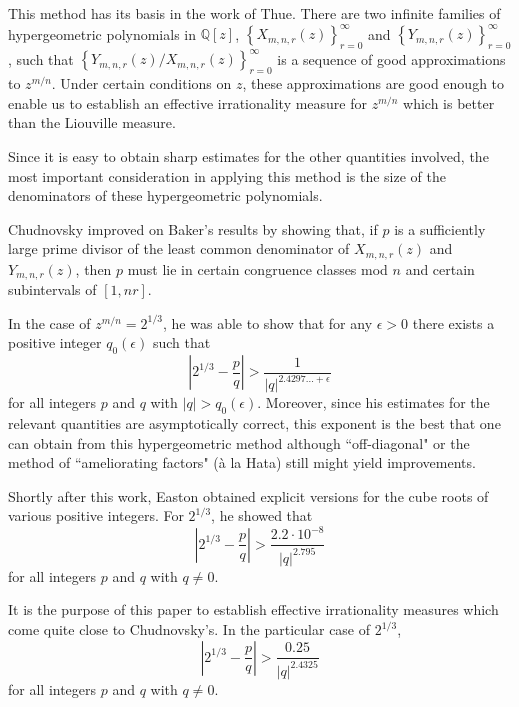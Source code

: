 \documentclass{jT}
\theoremstyle{definition}
\begin{document}
This method has its basis in the work of Thue. There are two infinite 
families of hypergeometric polynomials in $\mathbb{Q}[z]$, 
${ \left\{ X_{m,n,r}(z) \right\} }_{r=0}^{\infty}$ and 
${ \left\{ Y_{m,n,r}(z) \right\} }_{r=0}^{\infty}$, such 
that ${ \left\{ Y_{m,n,r}(z)/X_{m,n,r}(z) \right\} }_{r=0}^{\infty}$ 
is a sequence of good approximations to $z^{m/n}$. 
Under certain conditions on $z$, these approximations are 
good enough to enable us to establish an effective irrationality 
measure for $z^{m/n}$ which is better than the Liouville measure. 

Since it is easy to obtain sharp estimates for the other 
quantities involved, the most important consideration in 
applying this method is the size of the denominators of 
these hypergeometric polynomials.  

Chudnovsky \cite{Chud} improved on Baker's results by showing 
that, if $p$ is a sufficiently large prime divisor of the least 
common denominator of $X_{m,n,r}(z)$ and $Y_{m,n,r}(z)$, then 
$p$ must lie in certain congruence classes mod $n$ and certain 
subintervals of $[1,nr]$. 

In the case of $z^{m/n}=2^{1/3}$, he was able to show that 
for any $\epsilon > 0$ there exists a positive integer 
$q_{0}(\epsilon)$ such that 
\begin{displaymath}
\left| 2^{1/3} - \frac{p}{q} \right| > \frac{1}{|q|^{2.4297\ldots+\epsilon}} 
\end{displaymath}
for all integers $p$ and $q$ with $|q| > q_{0}(\epsilon)$. 
Moreover, since his estimates for the relevant quantities 
are asymptotically correct, this exponent is the best that 
one can obtain from this hypergeometric method although ``off-diagonal"
or the method of ``ameliorating factors" (\`{a} la Hata) still might yield
improvements.

Shortly after this work, Easton \cite{Easton} obtained explicit versions for
the cube roots of various positive integers. For $2^{1/3}$, he showed that
\begin{displaymath}
\left| 2^{1/3} - \frac{p}{q} \right| 
> \frac{2.2 \cdot 10^{-8}}{|q|^{2.795}}
\end{displaymath}
for all integers $p$ and $q$ with $q \neq 0$.

It is the purpose of this paper to establish effective irrationality measures which
come quite close to Chudnovsky's. In the particular case of $2^{1/3}$,
\begin{displaymath}
\left| 2^{1/3} - \frac{p}{q} \right| 
> \frac{0.25}{|q|^{2.4325}} 
\end{displaymath}
for all integers $p$ and $q$ with $q \neq 0$.
\end{document}
